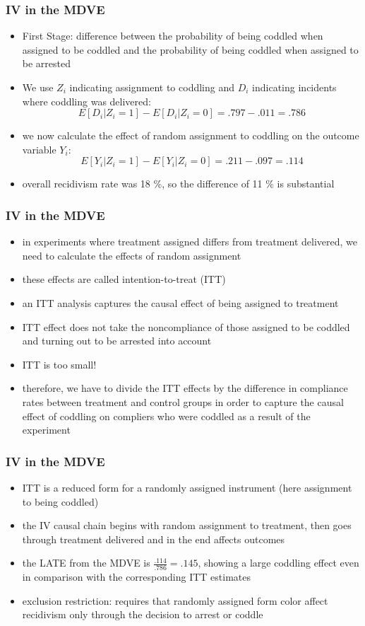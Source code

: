 \documentclass{beamer}
\begin{document}
\begin{frame}
\frametitle{IV in the MDVE}

\begin{itemize}
	\item First Stage: difference between the probability of being coddled when assigned to be coddled and the probability of being coddled when assigned to be arrested 
	\item We use $Z_i$ indicating assignment to coddling and $D_i$ indicating incidents where coddling was delivered:
	$$E[D_i|Z_i=1]-E[D_i|Z_i=0] = .797 -.011 = .786 $$
	\item we now calculate the effect of random assignment to coddling on the outcome variable $Y_i$:
	$$E[Y_i|Z_i=1]-E[Y_i|Z_i=0] = .211 - .097 = .114 $$
	\item overall recidivism rate was 18 \%, so the difference of 11 \% is substantial
\end{itemize}
\end{frame}
\begin{frame}
\frametitle{IV in the MDVE}
\begin{itemize}
\item in experiments where treatment assigned differs from treatment delivered, we need to calculate the effects of random assignment
\item these effects are called intention-to-treat (ITT)
\item an ITT analysis captures the causal effect of being assigned to treatment
\item ITT effect does not take the noncompliance of those assigned to be coddled and turning out to be arrested into account
\item ITT is too small!
\item therefore, we have to divide the ITT effects by the difference in compliance rates between treatment and control groups in order to capture the causal effect of coddling on compliers who were coddled as a result of the experiment
\end{itemize}

\end{frame}
\begin{frame}
\frametitle{IV in the MDVE}
\begin{itemize}
\item ITT is a reduced form for a randomly assigned instrument (here assignment to being coddled)
\item the IV causal chain begins with random assignment to treatment, then goes through treatment delivered and in the end affects outcomes
\item the LATE from the MDVE is $\frac{.114}{.786}=.145$, showing a large coddling effect even in comparison with the corresponding ITT estimates
\item exclusion restriction: requires that randomly assigned form color affect recidivism only through the decision to arrest or coddle
\end{itemize}

\end{frame}
\end{document}

